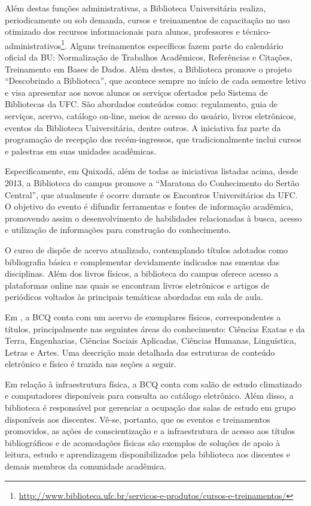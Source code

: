 Além destas funções administrativas, a Biblioteca Universitária realiza, periodicamente ou sob demanda, cursos e treinamentos de capacitação no uso otimizado dos recursos informacionais para alunos, professores e técnico-administrativos\footnote{\url{http://www.biblioteca.ufc.br/servicos-e-produtos/cursos-e-treinamentos/}}. Alguns treinamentos específicos fazem parte do calendário oficial da BU: Normalização de Trabalhos Acadêmicos, Referências e Citações, Treinamento em Bases de Dados. Além destes, a Biblioteca promove o projeto “Descobrindo a Biblioteca”, que acontece sempre no início de cada semestre letivo e visa apresentar aos novos alunos os serviços ofertados pelo Sistema de Bibliotecas da UFC. São abordados conteúdos como: regulamento, guia de serviços, acervo, catálogo on-line, meios de acesso do usuário, livros eletrônicos, eventos da Biblioteca Universitária, dentre outros. A iniciativa faz parte da programação de recepção dos recém-ingressos, que tradicionalmente inclui cursos e palestras em suas unidades acadêmicas.

Especificamente, em Quixadá, além de todas as iniciativas listadas acima, desde 2013, a Biblioteca do campus promove a “Maratona do Conhecimento do Sertão Central”, que atualmente é ocorre durante os Encontros Universitários da UFC. O objetivo do evento é difundir ferramentas e fontes de informação acadêmica, promovendo assim o desenvolvimento de habilidades relacionadas à busca, acesso e utilização de informações para construção do conhecimento.

O curso de \nomedocurso dispõe de acervo atualizado, contemplando títulos adotados como bibliografia básica e complementar devidamente indicados nas ementas das disciplinas. Além dos livros físicos, a biblioteca do campus oferece acesso a plataformas online nas quais se encontram livros eletrônicos e artigos de periódicos voltados às principais temáticas abordadas em sala de aula.

Em \ufcBCQAnoReferencia, a BCQ conta com um acervo de \ufcBCQExemplares exemplares físicos, correspondentes a \ufcBCQTitulos títulos, principalmente nas seguintes áreas do conhecimento: Ciências Exatas e da Terra, Engenharias, Ciências Sociais Aplicadas, Ciências Humanas, Linguística, Letras e Artes. Uma descrição mais detalhada das estruturas de conteúdo eletrônico e físico é trazida nas seções a seguir.

Em relação à infraestrutura física, a BCQ conta com salão de estudo climatizado e computadores disponíveis para consulta ao catálogo eletrônico. Além disso, a biblioteca é responsável por gerenciar a ocupação das salas de estudo em grupo disponíveis aos discentes. Vê-se, portanto, que os eventos e treinamentos promovidos, as ações de conscientização e a infraestrutura de acesso aos títulos bibliográficos e de acomodações físicas são exemplos de soluções de apoio à leitura, estudo e aprendizagem disponibilizados pela biblioteca aos discentes e demais membros da comunidade acadêmica.

